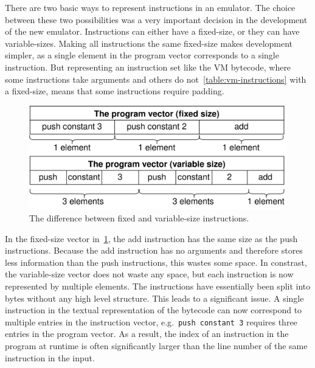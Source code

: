 There are two basic ways to represent instructions in an emulator.
The choice between these two possibilities was a very important decision in the development of the new emulator.
Instructions can either have a fixed-size, or they can have variable-sizes.
Making all instructions the same fixed-size makes development simpler, as a single element in the program vector corresponds to a single instruction.
But representing an instruction set like the VM bytecode, where some instructions take arguments and others do not~\ref{table:vm-instructions} with a fixed-size, means that some instructions require padding.
\begin{center}
  \begin{figure}[ht]
    \centering
    \includegraphics[width=12cm]{fig/instruction-size.png}
    \caption{The difference between fixed and variable-size instructions.}
    \label{fig:instruction-size}
  \end{figure}
\end{center}
In the fixed-size vector in~\cref{fig:instruction-size}, the add instruction has the same size as the push instructions.
Because the add instruction has no arguments and therefore stores less information than the push instructions, this wastes some space.
In constrast, the variable-size vector does not waste any space, but each instruction is now represented by multiple elements.
The instructions have essentially been split into bytes without any high level structure.
This leads to a significant issue.
A single instruction in the textual representation of the bytecode can now correspond to multiple entries in the instruction vector, e.g.\ \verb+push constant 3+ requires three entries in the program vector.
As a result, the index of an instruction in the program at runtime is often significantly larger than the line number of the same instruction in the input.

